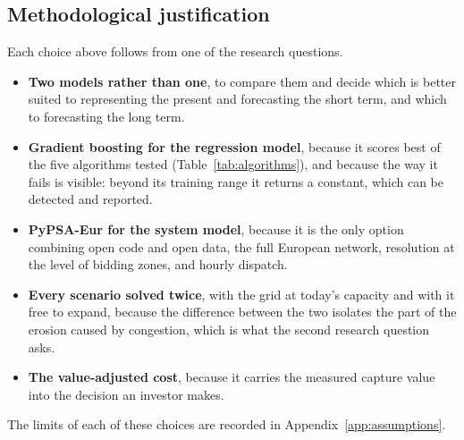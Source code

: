 \subsection{Methodological justification}\label{sec:method_why}

Each choice above follows from one of the research questions.

\begin{itemize}
          \item \textbf{Two models rather than one}, to compare them and decide
    which is better suited to representing the present and forecasting the
    short term, and which to forecasting the long term.
    \item \textbf{Gradient boosting for the regression model}, because it scores
    best of the five algorithms tested (Table~\ref{tab:algorithms}), and because
    the way it fails is visible: beyond its training range it returns a
    constant, which can be detected and reported.
    \item \textbf{PyPSA-Eur for the system model}, because it is the only option
    combining open code and open data, the full European network, resolution at
    the level of bidding zones, and hourly dispatch.
    \item \textbf{Every scenario solved twice}, with the grid at today's
    capacity and with it free to expand, because the difference between the two
    isolates the part of the erosion caused by congestion, which is what the
    second research question asks.
    \item \textbf{The value-adjusted cost}, because it carries the measured
    capture value into the decision an investor makes.
\end{itemize}

The limits of each of these choices are recorded in
Appendix~\ref{app:assumptions}.